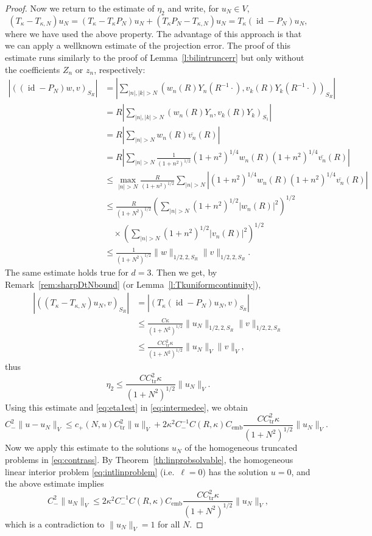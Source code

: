 \documentclass[12pt,DIV=14]{scrartcl}
\providecommand{\id}{\operatorname{id}}
\begin{document}
\begin{proof}
Now we return to the estimate of $\eta_2$ and write, for $u_N\in V$,
\[
(T_\kappa - T_{\kappa,N}) u_N
=(T_\kappa - T_\kappa P_N) u_N + (T_\kappa P_N - T_{\kappa,N}) u_N
=T_\kappa (\id - P_N) u_N,
\]
where we have used the above property.
The advantage of this approach is that we can apply a wellknown estimate
of the projection error.
The proof of this estimate runs similarly to the proof of Lemma~\ref{l:bilintruncerr}
but only without the coefficients $Z_n$ or $z_n$, respectively:
\begin{align*}
\left|\left((\id - P_N) w,v\right)_{S_R}\right|
&= \left|\sum_{|n|,|k|> N}
\left(w_n(R)Y_n(R^{-1}\cdot),v_k(R)Y_k(R^{-1}\cdot)\right)_{S_R}\right|
\\
&= R\left|\sum_{|n|,|k|> N}
\left(w_n(R)Y_n,v_k(R)Y_k\right)_{S_1}\right|
\\
&= R\left|\sum_{|n|> N}
w_n(R)\overline{v_n}(R)\right|\\
&= R\left|\sum_{|n|> N}
\frac{1}{(1+n^2)^{1/2}}(1+n^2)^{1/4}w_n(R)(1+n^2)^{1/4}\overline{v_n}(R)\right|\\
&\le \max_{|n|> N}
\frac{R}{(1+n^2)^{1/2}}
\sum_{|n|> N}\left|(1+n^2)^{1/4}w_n(R)(1+n^2)^{1/4}\overline{v_n}(R)\right|\\
&\le \frac{R}{(1+N^2)^{1/2}}
\left(\sum_{|n|> N}(1+n^2)^{1/2}\left|w_n(R)\right|^2\right)^{1/2}\\
&\quad \times
\left(\sum_{|n|> N}(1+n^2)^{1/2}\left|v_n(R)\right|^2\right)^{1/2}\\
&\le \frac{1}{(1+N^2)^{1/2}}\|w\|_{1/2,2,S_R}\|v\|_{1/2,2,S_R}.
\end{align*}
The same estimate holds true for $d=3$.
Then we get, by Remark~\ref{rem:sharpDtNbound} (or Lemma~\ref{l:Tkuniformcontinuity}),
\begin{align*}
\left|\left((T_\kappa - T_{\kappa,N}) u_N,v\right)_{S_R}\right|
&=\left|\left(T_\kappa (\id - P_N) u_N,v\right)_{S_R}\right|\\
&\le \frac{C\kappa}{(1+N^2)^{1/2}}\|u_N\|_{1/2,2,S_R}\|v\|_{1/2,2,S_R}\\
&\le \frac{CC_\mathrm{tr}^2\kappa}{(1+N^2)^{1/2}}\|u_N\|_V\|v\|_V,
\end{align*}
thus
\[
\eta_2 \le \frac{CC_\mathrm{tr}^2\kappa}{(1+N^2)^{1/2}} \|u_N\|_V.
\]
Using this estimate and \eqref{eq:eta1est} in \eqref{eq:intermedee}, we obtain
\begin{equation}\label{eq:schatzest}
C_-^2 \|u-u_N\|_V \le c_+(N,u) C_\mathrm{tr}^2 \|u\|_V + 2\kappa^2 C_-^{-1}C(R,\kappa) C_\mathrm{emb}
\frac{CC_\mathrm{tr}^2\kappa}{(1+N^2)^{1/2}} \|u_N\|_V.
\end{equation}
Now we apply this estimate to the solutions $u_N$ of the homogeneous truncated problems
in \eqref{eq:contrass}.
By Theorem~\ref{th:linprobsolvable}, the homogeneous linear interior problem \eqref{eq:intlinproblem}
(i.e.\ $\ell=0$) has the solution $u=0$, and the above estimate implies
\[
C_-^2 \|u_N\|_V \le 2\kappa^2 C_-^{-1}C(R,\kappa) C_\mathrm{emb}
\frac{CC_\mathrm{tr}^2\kappa}{(1+N^2)^{1/2}} \|u_N\|_V,
\]
which is a contradiction to $\|u_N\|_V=1$ for all $N$.
\end{proof}
\end{document}
